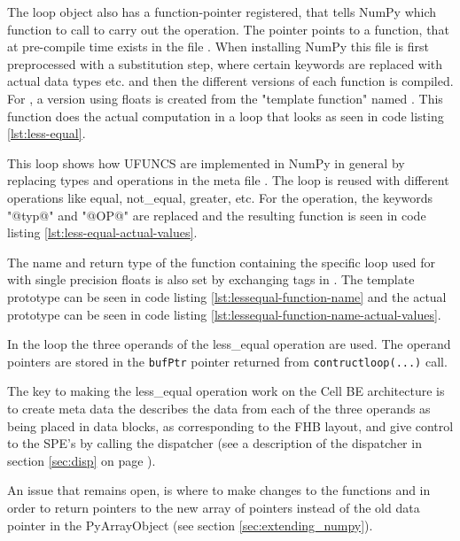 The loop object also has a function-pointer registered, that tells
NumPy which function to call to carry out the 
operation. The pointer points to a function, that at pre-compile time
exists in the file . When installing NumPy
this file is first preprocessed with a substitution step, where
certain keywords are replaced with actual data types etc. and then the
different versions of each function is compiled.
For , a version using floats is created from the
"template function" named . This function
does the actual computation in a loop that looks as seen in code
listing \ref{lst:less-equal}.

This loop shows how UFUNCS are implemented in NumPy in general by
replacing types and operations in the meta file .
The loop is reused with different operations like equal, not\_equal,
greater, etc. For the  operation, the keywords
"@typ@" and "@OP@" are replaced and the resulting function is seen in
code listing \ref{lst:less-equal-actual-values}.


The name and return type of the function containing the specific loop
used for  with single precision floats is also set by
exchanging tags in . The template prototype can be
seen in code listing \ref{lst:lessequal-function-name} and the actual
prototype can be seen in code
listing \ref{lst:lessequal-function-name-actual-values}.


In the loop the three operands of the less\_equal operation are used. The operand pointers are stored in the \texttt{bufPtr} pointer
returned from \texttt{contructloop(...)} call.

The key to making the less\_equal operation work on the Cell BE architecture is to create meta data the describes the data from
each of the three operands as being placed in data blocks, as corresponding to the FHB layout, and give control to the SPE's by
calling the dispatcher (see a description of the dispatcher in section \ref{sec:disp} on page \pageref{sec:disp}).


An issue that remains open, is where to make changes to the
functions 
and  in order to return pointers to the
new  array of pointers instead of the old data
pointer in the PyArrayObject (see section \ref{sec:extending_numpy}).


